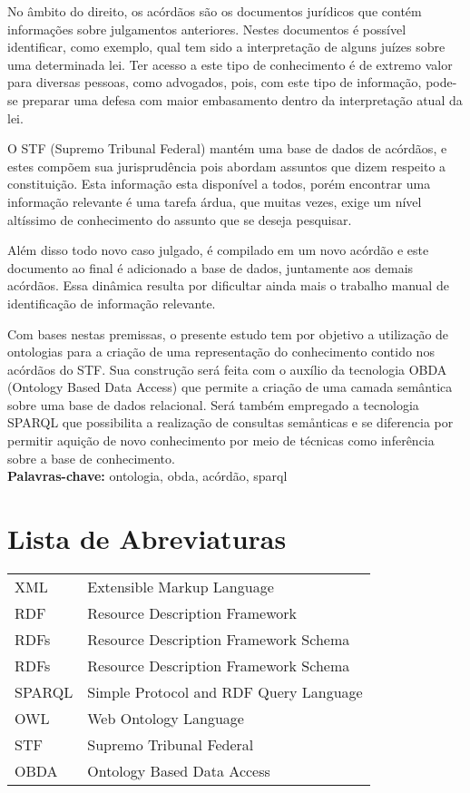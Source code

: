 \documentclass[11pt,twoside,a4paper]{book}
\begin{document}
No âmbito do direito, os acórdãos são os documentos jurídicos que contém 
informações sobre julgamentos anteriores. Nestes documentos é possível 
identificar, como exemplo, qual tem sido a interpretação de alguns juízes sobre 
uma determinada lei. Ter acesso a este tipo de conhecimento é de extremo valor 
para diversas pessoas, como advogados, pois, com este tipo de informação, 
pode-se preparar uma defesa com maior embasamento dentro da interpretação atual
da lei.

O STF (Supremo Tribunal Federal) mantém uma base de dados de acórdãos, e estes
compõem sua jurisprudência pois abordam assuntos que dizem respeito a 
constituição. Esta informação esta disponível a todos, porém encontrar uma
informação relevante é uma tarefa árdua, que muitas vezes, exige um nível 
altíssimo de conhecimento do assunto que se deseja pesquisar.

Além disso todo novo caso julgado, é compilado em um novo acórdão e este
documento ao final é adicionado a base de dados, juntamente aos demais 
acórdãos. Essa dinâmica resulta por dificultar ainda mais o trabalho manual 
de identificação de informação relevante.

Com bases nestas premissas, o presente estudo tem por objetivo a utilização 
de ontologias para a criação de uma representação do conhecimento contido nos 
acórdãos do STF. Sua construção será feita com o auxílio da tecnologia OBDA 
(Ontology Based Data Access) que permite a criação de uma camada semântica sobre 
uma base de dados relacional. Será também empregado a tecnologia SPARQL que 
possibilita a realização de consultas semånticas e se diferencia por permitir 
aquição de novo conhecimento por meio de técnicas como inferência sobre a base 
de conhecimento.
\\

\noindent \textbf{Palavras-chave:} ontologia, obda, acórdão, sparql

\tableofcontents    %

\chapter{Lista de Abreviaturas}
\begin{tabular}{ll}
    XML & Extensible Markup Language \\
    RDF & Resource Description Framework \\
    RDFs & Resource Description Framework Schema \\
    RDFs & Resource Description Framework Schema \\
    SPARQL & Simple Protocol and RDF Query Language \\
    OWL & Web Ontology Language \\
    STF & Supremo Tribunal Federal \\
    OBDA & Ontology Based Data Access \\
\end{tabular}
\end{document}
